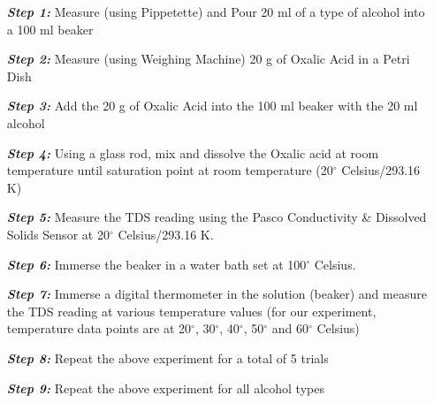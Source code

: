 \textit{}

\begin{enumerate}
    \item[\textbf{\textit{Step 1:}}] {Measure (using Pippetette) and Pour 20 ml of a type of alcohol into a 100 ml beaker}
    \item[\textbf{\textit{Step 2:}}] {Measure (using Weighing Machine) 20 g of Oxalic Acid in a Petri Dish}
    \item[\textbf{\textit{Step 3:}}] {Add the 20 g of Oxalic Acid into the 100 ml beaker with the 20 ml alcohol}
    \item[\textbf{\textit{Step 4:}}] {Using a glass rod, mix and dissolve the Oxalic acid at room temperature until saturation point at room temperature (20$^\circ$ Celsius/293.16 K)}
    \item[\textbf{\textit{Step 5:}}] {Measure the TDS reading using the Pasco Conductivity & Dissolved Solids Sensor at 20$^\circ$ Celsius/293.16 K.}
    \item[\textbf{\textit{Step 6:}}] {Immerse the beaker in a water bath set at 100$^\circ$ Celsius.}
    \item[\textbf{\textit{Step 7:}}] {Immerse a digital thermometer in the solution (beaker) and measure the TDS reading at various temperature values (for our experiment, temperature data points are at 20$^\circ$, 30$^\circ$, 40$^\circ$, 50$^\circ$ and 60$^\circ$ Celsius)}
    \item[\textbf{\textit{Step 8:}}] {Repeat the above experiment for a total of 5 trials}
    \item[\textbf{\textit{Step 9:}}] {Repeat the above experiment for all alcohol types}
    \label{pro}
\end{enumerate}

